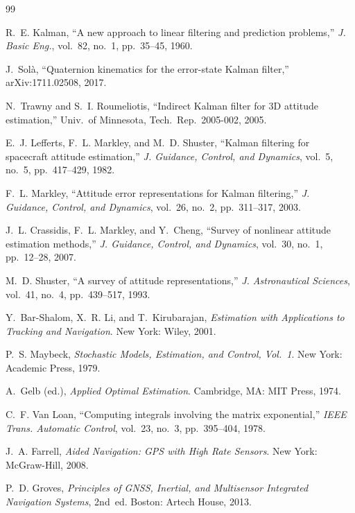 \documentclass[11pt]{article}
\begin{document}
\begin{thebibliography}{99}

R.~E. Kalman, ``A new approach to linear filtering and prediction problems,''
\emph{J. Basic Eng.}, vol.~82, no.~1, pp.~35--45, 1960.

J.~Sol\`a, ``Quaternion kinematics for the error-state Kalman filter,'' arXiv:1711.02508, 2017.

N.~Trawny and S.~I. Roumeliotis, ``Indirect Kalman filter for 3D attitude estimation,''
Univ.\ of Minnesota, Tech.\ Rep.\ 2005-002, 2005.

E.~J. Lefferts, F.~L. Markley, and M.~D. Shuster, ``Kalman filtering for spacecraft attitude
estimation,'' \emph{J. Guidance, Control, and Dynamics}, vol.~5, no.~5, pp.~417--429, 1982.

F.~L. Markley, ``Attitude error representations for Kalman filtering,''
\emph{J. Guidance, Control, and Dynamics}, vol.~26, no.~2, pp.~311--317, 2003.

J.~L. Crassidis, F.~L. Markley, and Y.~Cheng, ``Survey of nonlinear attitude estimation methods,''
\emph{J. Guidance, Control, and Dynamics}, vol.~30, no.~1, pp.~12--28, 2007.

M.~D. Shuster, ``A survey of attitude representations,''
\emph{J. Astronautical Sciences}, vol.~41, no.~4, pp.~439--517, 1993.

Y.~Bar-Shalom, X.~R. Li, and T.~Kirubarajan, \emph{Estimation with Applications to Tracking and
Navigation}. New York: Wiley, 2001.

P.~S. Maybeck, \emph{Stochastic Models, Estimation, and Control, Vol.~1}. New York: Academic Press, 1979.

A.~Gelb (ed.), \emph{Applied Optimal Estimation}. Cambridge, MA: MIT Press, 1974.

C.~F. Van Loan, ``Computing integrals involving the matrix exponential,''
\emph{IEEE Trans. Automatic Control}, vol.~23, no.~3, pp.~395--404, 1978.

J.~A. Farrell, \emph{Aided Navigation: GPS with High Rate Sensors}. New York: McGraw-Hill, 2008.

P.~D. Groves, \emph{Principles of GNSS, Inertial, and Multisensor Integrated Navigation Systems},
2nd~ed. Boston: Artech House, 2013.


\end{thebibliography}
\end{document}
